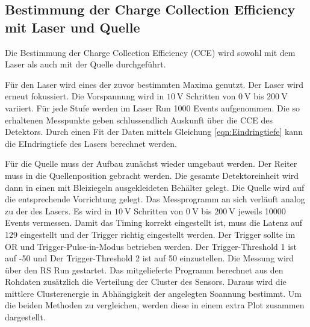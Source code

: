 \subsection{Bestimmung der Charge Collection Efficiency mit Laser und Quelle}

Die Bestimmung der Charge Collection Efficiency (CCE) wird sowohl mit dem Laser als auch mit der Quelle durchgeführt.

Für den Laser wird eines der zuvor bestimmten Maxima genutzt.
Der Laser wird erneut fokussiert.
Die Vorspannung wird in $\SI{10}{\volt}$ Schritten von $\SI{0}{\volt}$ bis $\SI{200}{\volt}$ variiert.
Für jede Stufe werden im Laser Run 1000 Events aufgenommen.
Die so erhaltenen Messpunkte geben schlussendlich Auskunft über die CCE des Detektors.
Durch einen Fit der Daten mittels Gleichung \eqref{eqn:Eindringtiefe} kann die EIndringtiefe des Lasers berechnet werden.

Für die Quelle muss der Aufbau zunächst wieder umgebaut werden.
Der Reiter muss in die Quellenposition gebracht werden.
Die gesamte Detektoreinheit wird dann in einen mit Bleiziegeln ausgekleideten Behälter gelegt.
Die Quelle wird auf die entsprechende Vorrichtung gelegt.
Das Messprogramm an sich verläuft analog zu der des Lasers.
Es wird in $\SI{10}{\volt}$ Schritten von $\SI{0}{\volt}$ bis $\SI{200}{\volt}$ jeweils 10000 Events vermessen.
Damit das Timing korrekt eingestellt ist, muss die Latenz auf 129 eingestellt und der Trigger richtig eingestellt werden.
Der Trigger sollte im OR und Trigger-Pulse-in-Modus betrieben werden.
Der Trigger-Threshold 1 ist auf -50 und Der Trigger-Threshold 2 ist auf 50 einzustellen.
Die Messung wird über den RS Run gestartet.
Das mitgelieferte Programm berechnet aus den Rohdaten zusätzlich die Verteilung der Cluster des Sensors.
Daraus wird die mittlere Clusterenergie in Abhängigkeit der angelegten Soannung bestimmt.
Um die beiden Methoden zu vergleichen, werden diese in einem extra Plot zusammen dargestellt.








%
